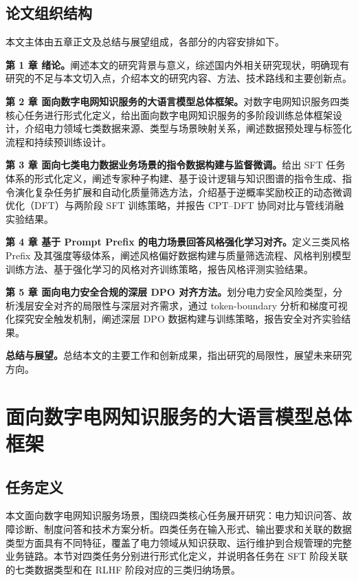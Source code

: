 \documentclass[fontset=fandol,type=master,campus=shenzhen,etitleauto=true]{hithesisbook}
\begin{document}
\section{论文组织结构}\label{ux8bbaux6587ux7ec4ux7ec7ux7ed3ux6784}

本文主体由五章正文及总结与展望组成，各部分的内容安排如下。

\textbf{第 1 章 绪论。}阐述本文的研究背景与意义，综述国内外相关研究现状，明确现有研究的不足与本文切入点，介绍本文的研究内容、方法、技术路线和主要创新点。

\textbf{第 2 章 面向数字电网知识服务的大语言模型总体框架。}对数字电网知识服务四类核心任务进行形式化定义，给出面向数字电网知识服务的多阶段训练总体框架设计，介绍电力领域七类数据来源、类型与场景映射关系，阐述数据预处理与标签化流程和持续预训练设计。

\textbf{第 3 章 面向七类电力数据业务场景的指令数据构建与监督微调。}给出 SFT 任务体系的形式化定义，阐述专家种子构建、基于设计逻辑与知识图谱的指令生成、指令演化复杂任务扩展和自动化质量筛选方法，介绍基于逆概率奖励校正的动态微调优化（DFT）与两阶段 SFT 训练策略，并报告 CPT--DFT 协同对比与管线消融实验结果。

\textbf{第 4 章 基于 Prompt Prefix 的电力场景回答风格强化学习对齐。}定义三类风格 Prefix 及其强度等级体系，阐述风格偏好数据构建与质量筛选流程、风格判别模型训练方法、基于强化学习的风格对齐训练策略，报告风格评测实验结果。

\textbf{第 5 章 面向电力安全合规的深层 DPO 对齐方法。}划分电力安全风险类型，分析浅层安全对齐的局限性与深层对齐需求，通过 token-boundary 分析和梯度可视化探究安全触发机制，阐述深层 DPO 数据构建与训练策略，报告安全对齐实验结果。

\textbf{总结与展望。}总结本文的主要工作和创新成果，指出研究的局限性，展望未来研究方向。


\chapter{面向数字电网知识服务的大语言模型总体框架}\label{ux9762ux5411ux7535ux529bux77e5ux8bc6ux670dux52a1ux7684ux5927ux8bedux8a00ux6a21ux578bux603bux4f53ux6846ux67b6}

\section{任务定义}\label{ux4efbux52a1ux5b9aux4e49}

本文面向数字电网知识服务场景，围绕四类核心任务展开研究：电力知识问答、故障诊断、制度问答和技术方案分析。四类任务在输入形式、输出要求和关联的数据类型方面具有不同特征，覆盖了电力领域从知识获取、运行维护到合规管理的完整业务链路。本节对四类任务分别进行形式化定义，并说明各任务在 SFT 阶段关联的七类数据类型和在 RLHF 阶段对应的三类归纳场景。
\end{document}

